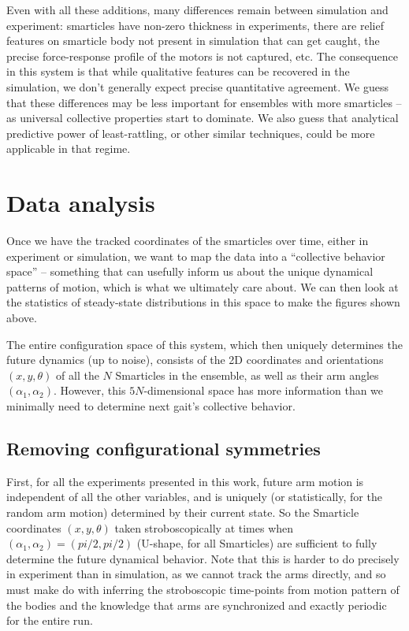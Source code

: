 \documentclass[reprint,prx]{revtex4-1}
\renewcommand{\=}[1]{\stackrel{#1}{=}} %
\renewcommand{\(}{\left (}
\renewcommand{\)}{\right  )}
\renewcommand{\[}{\left [}
\renewcommand{\]}{\right ]}
\newcommand{\<}{\left <}
\renewcommand{\>}{\right >}
\theoremstyle{definition}
\theoremstyle{remark}
\begin{document}
Even with all these additions, many differences remain between simulation and experiment: smarticles have non-zero thickness in experiments, there are relief features on smarticle body not present in simulation that can get caught, the precise force-response profile of the motors is not captured, etc. The consequence in this system is that while qualitative features can be recovered in the simulation, we don't generally expect precise quantitative agreement. We guess that these differences may be less important for ensembles with more smarticles -- as universal collective properties start to dominate. We also guess that analytical predictive power of least-rattling, or other similar techniques, could be more applicable in that regime.

\section{Data analysis} \label{app:dataAnal}

Once we have the tracked coordinates of the smarticles over time, either in experiment or simulation, we want to map the data into a ``collective behavior space'' -- something that can usefully inform us about the unique dynamical patterns of motion, which is what we ultimately care about. We can then look at the statistics of steady-state distributions in this space to make the figures shown above. 

The entire configuration space of this system, which then uniquely determines the future dynamics (up to noise), consists of the 2D coordinates and orientations $ (x,y,\theta) $ of all the $ N $ Smarticles in the ensemble, as well as their arm angles $ (\alpha_1, \alpha_2) $. However, this $ 5N $-dimensional space has more information than we minimally need to determine next gait's collective behavior. 

\subsection{Removing configurational symmetries}
First, for all the experiments presented in this work, future arm motion is independent of all the other variables, and is uniquely (or statistically, for the random arm motion) determined by their current state. So the Smarticle coordinates $ (x,y,\theta) $ taken stroboscopically at times when $ (\alpha_1, \alpha_2) = (pi/2,pi/2)$ (U-shape, for all Smarticles) are sufficient to fully determine the future dynamical behavior. Note that this is harder to do precisely in experiment than in simulation, as we cannot track the arms directly, and so must make do with inferring the stroboscopic time-points from motion pattern of the bodies and the knowledge that arms are synchronized and exactly periodic for the entire run. 
\end{document}
